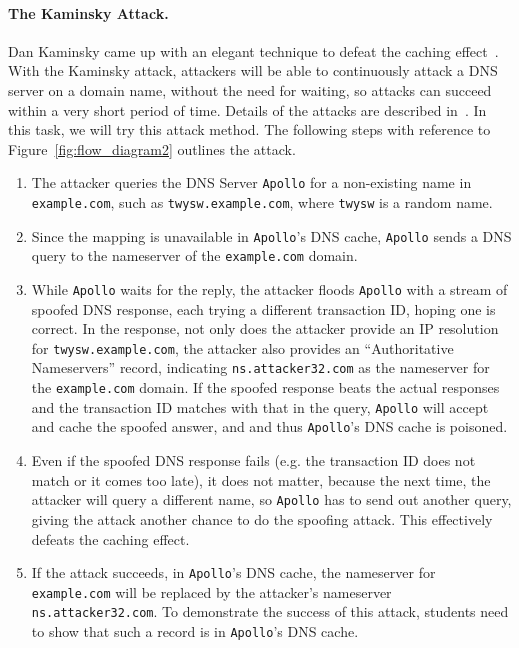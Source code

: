 \paragraph{The Kaminsky Attack.} 
Dan Kaminsky came up with an elegant technique to defeat the caching
effect~\cite{dns:Kaminsky}.
With the Kaminsky attack, attackers will be able to continuously attack
a DNS server on a domain name, without the need for waiting, so
attacks can succeed within a very short period of time.
Details of the attacks are described in~\cite{dns:Kaminsky,seedbook}. 
In this task, we will try this attack method. The following steps with reference to 
Figure~\ref{fig:flow_diagram2} outlines the attack. 

\begin{enumerate}
\item The attacker queries the DNS Server {\tt Apollo} for a non-existing name in 
{\tt example.com}, such as {\tt twysw.example.com},
where {\tt twysw} is a random name. 

\item Since the mapping is unavailable in {\tt Apollo}'s DNS cache, 
{\tt Apollo} sends a DNS query to the nameserver of
the {\tt example.com} domain.

\item While {\tt Apollo} waits for the reply, 
the attacker floods {\tt Apollo} with a stream of spoofed DNS response,
each trying a different transaction ID, hoping one is correct.
In the response, not only does the attacker provide an IP resolution
for {\tt twysw.example.com}, the attacker 
also provides an ``Authoritative Nameservers'' record, indicating 
{\tt ns.attacker32.com} as the nameserver for the {\tt example.com} domain.
If the spoofed response beats the actual responses and
the transaction ID matches with that in the query, 
{\tt Apollo} will accept and cache the spoofed answer, and
and thus {\tt Apollo}'s DNS cache is poisoned.  

\item Even if the spoofed DNS response fails (e.g.
the transaction ID does not match or it comes too late),
it does not matter, because the next time, the attacker will query
a different name, so {\tt Apollo} has to send out another query, 
giving the attack another chance to do the spoofing attack. 
This effectively defeats the caching effect.


\item If the attack succeeds, in {\tt Apollo}'s DNS cache, the
nameserver for {\tt example.com} will be replaced by the attacker's
nameserver {\tt ns.attacker32.com}.
To demonstrate the success of this attack, students need to show that such a record 
is in {\tt Apollo}'s DNS cache. 

\end{enumerate}



